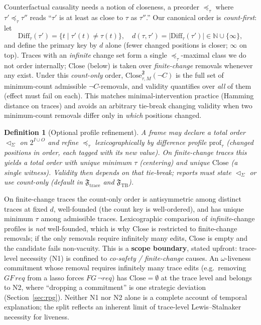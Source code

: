 \documentclass[11pt]{article}
\newtheorem{definition}{Definition}
\theoremstyle{remark}
\newcommand{\Close}{\mathrm{Close}}
\newcommand{\Nat}{\mathbb{N}}
\newcommand{\Frame}{\mathfrak{F}}
\begin{document}
Counterfactual causality needs a notion of closeness, a preorder \(\preceq_\tau\)
where \(\tau'\preceq_\tau\tau''\) reads ``\(\tau'\) is at least as close to
\(\tau\) as \(\tau''\).'' Our canonical order is \emph{count-first}: let
\[
  \mathrm{Diff}_\tau(\tau')=\{t\mid\tau'(t)\neq\tau(t)\},\quad
  d(\tau,\tau')=|\mathrm{Diff}_\tau(\tau')|\in\Nat\cup\{\infty\},
\]
and define the primary key by \(d\) alone (fewer changed positions is closer;
\(\infty\) on top). Traces with an \emph{infinite} change set form a single
\(\preceq_\tau\)-maximal class we do not order internally; \(\Close\) (below) is
taken over \emph{finite-change} removals whenever any exist. Under this
\emph{count-only} order, \(\Close_{\tau,M}^{\Frame}(\neg C)\) is the full set of
minimum-count admissible \(\neg C\)-removals, and validity quantifies over
\emph{all} of them (effect must fail on each). This matches minimal-intervention
practice (Hamming distance on traces) and avoids an arbitrary tie-break changing
validity when two minimum-count removals differ only in \emph{which} positions
changed.

\begin{definition}[Optional profile refinement]
\label{def:profile-refine}
A frame may declare a total order \(\lhd_\Sigma\) on \(2^{I\cup O}\) and refine
\(\preceq_\tau\) lexicographically by difference profile \(\mathrm{prof}_\tau\)
(changed positions in order, each tagged with its new value). On finite-change
traces this yields a \emph{total} order with unique minimum \(\tau\) (centering)
and unique \(\Close\) (a single witness). Validity then depends on that tie-break;
reports must state \(\lhd_\Sigma\) or use count-only (default in
\(\Frame_{\mathrm{trace}}\) and \(\Frame_{\mathrm{TB}}\)).
\end{definition}

On finite-change traces the count-only order is antisymmetric among distinct
traces at fixed \(d\), well-founded (the count key is well-ordered), and has
unique minimum \(\tau\) among admissible traces. Lexicographic comparison of
\emph{infinite}-change profiles is \emph{not} well-founded, which is why
\(\Close\) is restricted to finite-change removals; if the only removals require
infinitely many edits, \(\Close\) is empty and the candidate fails non-vacuity.
This is a \textbf{scope boundary}, stated upfront: trace-level necessity (N1)
is confined to \emph{co-safety / finite-change} causes. An \(\omega\)-liveness
commitment whose removal requires infinitely many trace edits (e.g.\ removing
\(GF\,req\) from a lasso forces \(FG\,\neg req\)) has \(\Close=\emptyset\) at
the trace level and belongs to N2, where ``dropping a commitment'' is one
strategic deviation (Section~\ref{sec:rpg}). Neither N1 nor N2 alone is a
complete account of temporal explanation; the split reflects an inherent limit of
trace-level Lewis--Stalnaker necessity for liveness.
\end{document}
